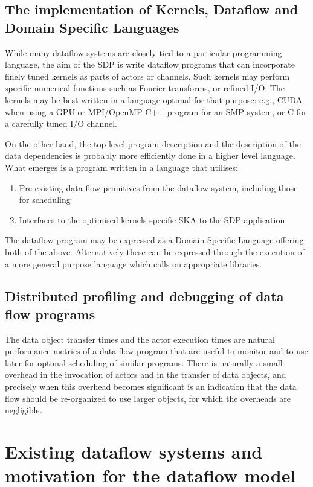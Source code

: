 \documentclass[11pt,a4paper]{article}
\begin{document}
\subsection{The implementation of Kernels, Dataflow and Domain Specific Languages}

While many dataflow systems are closely tied to a particular
programming language, the aim of the SDP is write dataflow programs
that can incorporate finely tuned kernels as parts of actors or
channels.  Such kernels may perform specific numerical functions such
as Fourier transforms, or refined I/O. The kernels may be best written
in a language optimal for that purpose: e.g., CUDA when using a GPU or
MPI/OpenMP C++ program for an SMP system, or C for a carefully tuned
I/O channel.

On the other hand, the top-level program description and the
description of the data dependencies is probably more efficiently done
in a higher level language. What emerges is a program written in a
language that utilises:

\begin{enumerate}
  \item Pre-existing data flow primitives from the dataflow system,
    including those for scheduling
  \item Interfaces to the optimised kernels specific SKA to the SDP
    application
\end{enumerate}
The dataflow program may be expressed as a Domain Specific Language
offering both of the above. Alternatively these can be expressed
through the execution of a more general purpose language which calls
on appropriate libraries.

\subsection{Distributed profiling and debugging of data flow programs}

The data object transfer times and the actor execution times are
natural performance metrics of a data flow program that are useful to
monitor and to use later for optimal scheduling of similar programs.
There is naturally a small overhead in the invocation of actors and in
the transfer of data objects, and precisely when this overhead becomes
significant is an indication that the data flow should be re-organized
to use larger objects, for which the overheads are negligible.  

\section{Existing dataflow systems and motivation for the dataflow model}
\label{sec:exist-datafl-syst}
\end{document}
